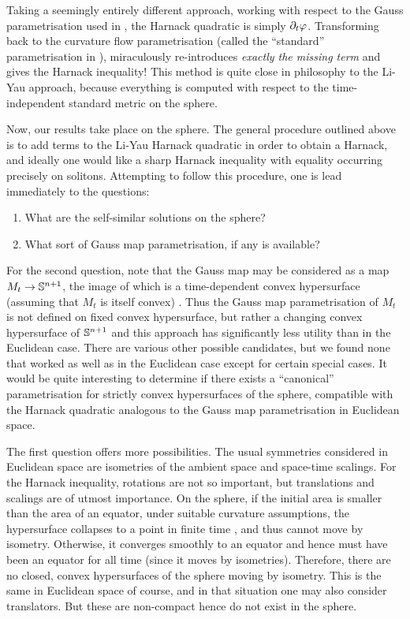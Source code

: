 \documentclass{amsart}
\begin{document}
Taking a seemingly entirely different approach, working with respect to the Gauss parametrisation used in \cite{MR1296393}, the Harnack quadratic is simply \(\partial_t \p\). Transforming back to the curvature flow parametrisation (called the ``standard'' parametrisation in \cite{MR1296393}), miraculously re-introduces \emph{exactly the missing term} and gives the Harnack inequality! This method is quite close in philosophy to the Li-Yau approach, because everything is computed with respect to the time-independent standard metric on the sphere.

Now, our results take place on the sphere. The general procedure outlined above is to add terms to the Li-Yau Harnack quadratic in order to obtain a Harnack, and ideally one would like a sharp Harnack inequality with equality occurring precisely on solitons. Attempting to follow this procedure, one is lead immediately to the questions: 
\begin{enumerate}
\item What are the self-similar solutions on the sphere?
\item What sort of Gauss map parametrisation, if any is available? 
\end{enumerate}

For the second question, note that the Gauss map may be considered as a map \(M_t \to \S^{n+1}\), the image of which is a time-dependent convex hypersurface (assuming that \(M_t\) is itself convex) \cite{Gerhardt:/2006}. Thus the Gauss map parametrisation of \(M_t\) is not defined on fixed convex hypersurface, but rather a changing convex hypersurface of \(\S^{n+1}\) and this approach has significantly less utility than in the Euclidean case. There are various other possible candidates, but we found none that worked as well as in the Euclidean case except for certain special cases. It would be quite interesting to determine if there exists a ``canonical'' parametrisation for strictly convex hypersurfaces of the sphere, compatible with the Harnack quadratic analogous to the Gauss map parametrisation in Euclidean space.

The first question offers more possibilities. The usual symmetries considered in Euclidean space are isometries of the ambient space and space-time scalings. For the Harnack inequality, rotations are not so important, but translations and scalings are of utmost importance. On the sphere, if the initial area is smaller than the area of an equator, under suitable curvature assumptions, the hypersurface collapses to a point in finite time \cite[Theorem 0.1]{MR892052}, and thus cannot move by isometry. Otherwise, it converges smoothly to an equator and hence must have been an equator for all time (since it moves by isometries). Therefore, there are no closed, convex hypersurfaces of the sphere moving by isometry. This is the same in Euclidean space of course, and in that situation one may also consider translators. But these are non-compact hence do not exist in the sphere. 
\end{document}
